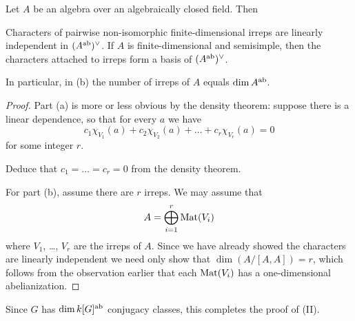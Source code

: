 \begin{theorem}
	Let $A$ be an algebra over an algebraically closed field. Then
	\begin{enumerate}[(a)]
		\ii Characters of pairwise non-isomorphic finite-dimensional irreps are
		linearly independent in $(A^\text{ab})^\vee$.
		\ii If $A$ is finite-dimensional and semisimple,
		then the characters attached to irreps
		form a basis of $(A^\text{ab})^\vee$.
	\end{enumerate}
	In particular, in (b) the number of irreps of $A$ equals $\dim A^\text{ab}$.
\end{theorem}
\begin{proof}
	Part (a) is more or less obvious by the density theorem:
	suppose there is a linear dependence, so that for every $a$ we have
	\[ c_1 \chi_{V_1}(a) + c_2 \chi_{V_2}(a) + \dots + c_r \chi_{V_r} (a) = 0\]
	for some integer $r$.
	\begin{ques}
		Deduce that $c_1 = \dots = c_r = 0$ from the density theorem.
	\end{ques}
	For part (b), assume there are $r$ irreps.
	We may assume that \[ A = \bigoplus_{i=1}^r \mathrm{Mat}(V_i) \]
	where $V_1$, \dots, $V_r$ are the irreps of $A$.
	Since we have already showed the characters are linearly independent
	we need only show that $\dim ( A / [A,A] ) = r$,
	which follows from the observation earlier that each $\mathrm{Mat}(V_i)$
	has a one-dimensional abelianization.
\end{proof}
Since $G$ has $\dim k[G]^\text{ab}$ conjugacy classes,
this completes the proof of (II).

